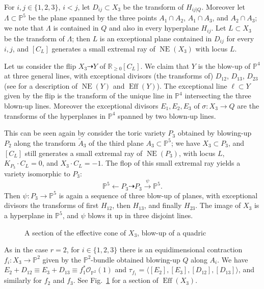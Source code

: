 \documentclass[a4paper,12pt]{amsart}
\theoremstyle{definition}
\numberwithin{figure}{section}
\numberwithin{table}{section}
\newcommand{\w}{\widetilde}
\newcommand{\la}{\longrightarrow}
\newcommand{\ol}{\mathcal{O}}
\newcommand{\pr}{\mathbb{P}}
\newcommand{\R}{\mathbb{R}}
\newcommand{\NE}{\operatorname{NE}}
\newcommand{\Eff}{\operatorname{Eff}}
\begin{document}
\bigskip

For $i,j\in\{1,2,3\}$, $i<j$, let $D_{ij}\subset X_3$ be the transform of $H_{ij|Q}$.
Moreover
let $\Lambda\subset\pr^5$ be the plane  spanned by the three points $A_1\cap A_2$, $A_1\cap A_3$, and $A_2\cap A_3$; we note that $\Lambda$ is contained in $Q$ and also in every hyperplane $H_{ij}$.
Let $L\subset X_3$ be the transform of $\Lambda$; then $L$ is an exceptional plane contained in $D_{ij}$ for every $i,j$, and $[C_L]$ generates a small extremal ray of $\NE(X_3)$ with locus $L$.

Let us consider the flip $X_3\dasharrow Y$ of $\R_{\geq 0}[C_L]$. We claim that $Y$ is the blow-up of $\pr^4$ at three general lines, with exceptional divisors (the transforms of) $D_{12}$, $D_{13}$, $D_{23}$ (see \cite{PP21} for a description of $\NE(Y)$ and $\Eff(Y)$). The exceptional line $\ell\subset Y$ given by the flip is the transform of the unique line in $\pr^4$ intersecting the three blown-up lines. Moreover the exceptional divisors $E_1,E_2,E_3$ of $\sigma\colon X_3\to Q$ are the transforms of the hyperplanes in $\pr^4$ spanned by two  blown-up lines.

This can be seen again by consider the toric variety $P_3$ obtained by blowing-up $P_2$ along the transform $\w{A}_3$ of the third plane $A_3\subset\pr^5$; we have $X_3\subset P_3$, and $[C_L]$ still generates a small extremal ray of $\NE(P_3)$, with locus $L$, $K_{P_3}\cdot C_L=0$, and $X_3\cdot C_L=-1$. The flop of this small extremal ray yields a variety isomorphic to $P_3$:
$$\pr^5\longleftarrow P_3\dasharrow P_3\stackrel{\psi}{\la} \pr^5.$$
Then  $\psi\colon P_3\to \pr^5$ is again a sequence of three blow-up of planes, with exceptional divisors the transforms of first $H_{12}$, then $H_{13}$, and finally $H_{23}$. The image of $X_3$ is a hyperplane in $\pr^5$, and $\psi$ blows it up in three disjoint lines.

\begin{figure}\caption{A section of the effective cone of $X_3$, blow-up of a quadric}\label{figuraX3}

\bigskip
  

\end{figure}

As in the case $r=2$,
for $i\in\{1,2,3\}$ there is an equidimensional contraction $f_i\colon X_3\to\pr^2$ given by the $\pr^2$-bundle obtained blowing-up $Q$ along $A_i$.
We have $E_2+D_{12}\equiv E_3+D_{13}\equiv f_1^*\ol_{\pr^2}(1)$ and $\tau_{f_1}=\langle [E_2],[E_3],[D_{12}],[D_{13}]\rangle$, and similarly for $f_2$ and $f_3$. See Fig.~\ref{figuraX3} for a section of $\Eff(X_3)$.
\end{document}
